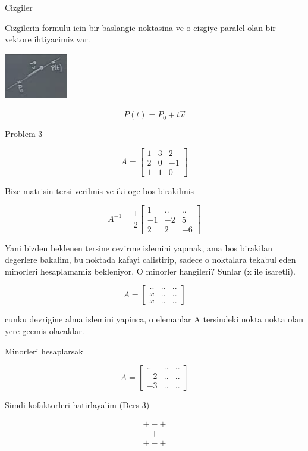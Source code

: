 \documentclass[12pt,fleqn]{article}
\begin{document}
Cizgiler

Cizgilerin formulu icin bir baslangic noktasina ve o cizgiye paralel olan
bir vektore ihtiyacimiz var. 

\includegraphics[height=2cm]{7_2.png}

\[ P(t) = P_0 + t \vec{v} \]

Problem 3

\[ A = 
\left[\begin{array}{rrr}
1 & 3 & 2 \\
2 & 0 & -1 \\
1 & 1 & 0
\end{array}\right]
 \]

Bize matrisin tersi verilmis ve iki oge bos birakilmis

\[ A^{-1} = \frac{1}{2}
\left[\begin{array}{rrr}
1 & .. & .. \\
-1 & -2 & 5 \\
2 & 2 & -6
\end{array}\right]
 \]

Yani bizden beklenen tersine cevirme islemini yapmak, ama bos birakilan
degerlere bakalim, bu noktada kafayi calistirip, sadece o noktalara tekabul 
eden minorleri hesaplamamiz bekleniyor. O minorler hangileri? Sunlar (x ile
isaretli). 

\[ A = 
\left[\begin{array}{rrr}
.. & .. & ..\\
x & .. & ..\\
x & .. & ..
\end{array}\right]
 \]

cunku devrigine alma islemini yapinca, o elemanlar A tersindeki nokta nokta olan
yere gecmis olacaklar. 

Minorleri hesaplarsak

\[ A = 
\left[\begin{array}{rrr}
.. & .. & ..\\
-2 & .. & ..\\
-3 & .. & ..
\end{array}\right]
 \]

Simdi kofaktorleri hatirlayalim (Ders 3)


\[ 
\begin{array}{rr}
+ - + \\
- + - \\
+ - + 
\end{array}
 \]
\end{document}
